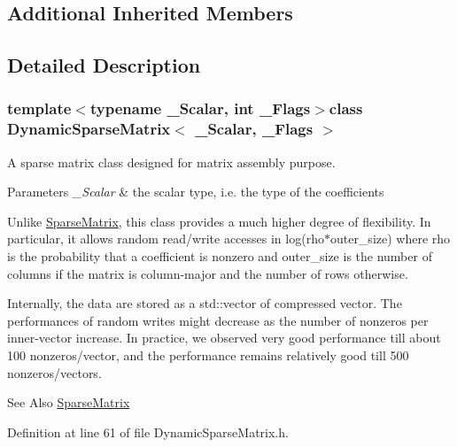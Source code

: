 \subsection*{Additional Inherited Members}


\subsection{Detailed Description}
\subsubsection*{template$<$typename \-\_\-\-Scalar, int \-\_\-\-Flags$>$class Dynamic\-Sparse\-Matrix$<$ \-\_\-\-Scalar, \-\_\-\-Flags $>$}

A sparse matrix class designed for matrix assembly purpose. 


\begin{DoxyParams}{Parameters}
{\em \-\_\-\-Scalar} & the scalar type, i.\-e. the type of the coefficients\\
\hline
\end{DoxyParams}
Unlike \hyperlink{class_sparse_matrix}{Sparse\-Matrix}, this class provides a much higher degree of flexibility. In particular, it allows random read/write accesses in log(rho$\ast$outer\-\_\-size) where {\ttfamily rho} is the probability that a coefficient is nonzero and outer\-\_\-size is the number of columns if the matrix is column-\/major and the number of rows otherwise.

Internally, the data are stored as a std\-::vector of compressed vector. The performances of random writes might decrease as the number of nonzeros per inner-\/vector increase. In practice, we observed very good performance till about 100 nonzeros/vector, and the performance remains relatively good till 500 nonzeros/vectors.

\begin{DoxySeeAlso}{See Also}
\hyperlink{class_sparse_matrix}{Sparse\-Matrix} 
\end{DoxySeeAlso}


Definition at line 61 of file Dynamic\-Sparse\-Matrix.\-h.



